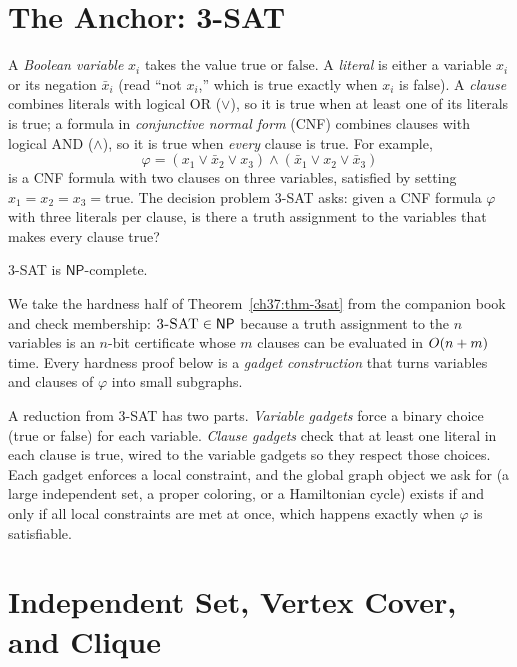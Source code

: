 \section{The Anchor: 3-SAT}
\label{ch37:3sat}

A \emph{Boolean variable} $x_i$ takes the value $\text{true}$ or $\text{false}$. A \emph{literal} is either a variable $x_i$ or its negation $\bar{x}_i$ (read ``not $x_i$,'' which is true exactly when $x_i$ is false). A \emph{clause} combines literals with logical OR ($\vee$), so it is true when at least one of its literals is true; a formula in \emph{conjunctive normal form} (CNF) combines clauses with logical AND ($\wedge$), so it is true when \emph{every} clause is true. For example,
\[
  \varphi = (x_1 \vee \bar{x}_2 \vee x_3) \wedge (\bar{x}_1 \vee x_2 \vee \bar{x}_3)
\]
is a CNF formula with two clauses on three variables, satisfied by setting $x_1 = x_2 = x_3 = \text{true}$. The decision problem \textsc{3-SAT} asks: given a CNF formula $\varphi$ with three literals per clause, is there a truth assignment to the variables that makes every clause true?

\begin{theorem}
\label{ch37:thm-3sat}
\textsc{3-SAT} is $\mathsf{NP}$-complete.
\end{theorem}

We take the hardness half of Theorem~\ref{ch37:thm-3sat} from the companion book and check membership:
$\textsc{3-SAT} \in \mathsf{NP}$ because a truth assignment to the $n$ variables is an $n$-bit certificate
whose $m$ clauses can be evaluated in $O(n+m)$ time. Every hardness proof below is a \emph{gadget
construction} that turns variables and clauses of $\varphi$ into small subgraphs.

\begin{intuitionbox}
A reduction from \textsc{3-SAT} has two parts. \emph{Variable gadgets}
force a binary choice (true or false) for each variable. \emph{Clause gadgets}
check that at least one literal in each clause is true, wired to the
variable gadgets so they respect those choices. Each gadget enforces a local constraint, and the global graph object we ask for (a large independent set, a proper coloring, or a Hamiltonian cycle)
exists if and only if all local constraints are met at once,
which happens exactly when $\varphi$ is satisfiable.
\end{intuitionbox}

\section{Independent Set, Vertex Cover, and Clique}
\label{ch37:isvc}

